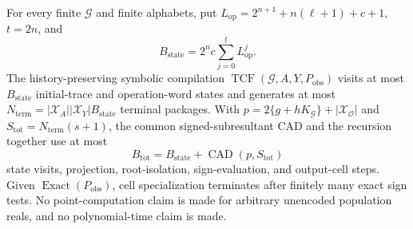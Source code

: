 For every finite \(\mathcal G\) and finite alphabets, put \(L_{\mathrm{op}}=2^{n+1}+n(\ell+1)+c+1\), \(t=2n\), and
\[
B_{\mathrm{state}}=2^n c\sum_{j=0}^{t}L_{\mathrm{op}}^j.
\]
The history-preserving symbolic compilation \(\operatorname{TCF}(\mathcal G,A,Y,P_{\mathrm{obs}})\) visits at most \(B_{\mathrm{state}}\) initial-trace and operation-word states and generates at most \(N_{\mathrm{term}}=|\mathcal X_A||\mathcal X_Y|B_{\mathrm{state}}\) terminal packages. With \(p=2\{g+hK_{\mathcal G}\}+|\mathcal X_{\mathcal O}|\) and \(S_{\mathrm{tot}}=N_{\mathrm{term}}(s+1)\), the common signed-subresultant CAD and the recursion together use at most
\[
B_{\mathrm{tot}}=B_{\mathrm{state}}+\operatorname{CAD}(p,S_{\mathrm{tot}})
\]
state visits, projection, root-isolation, sign-evaluation, and output-cell steps. Given \(\operatorname{Exact}(P_{\mathrm{obs}})\), cell specialization terminates after finitely many exact sign tests. No point-computation claim is made for arbitrary unencoded population reals, and no polynomial-time claim is made.